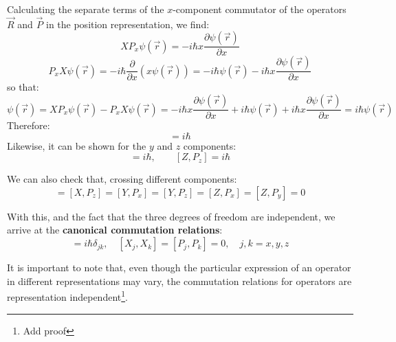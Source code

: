 Calculating the separate terms of the $x$-component commutator of the operators $\vec{R}$ and $\vec{P}$ in the position representation, we find:
\begin{equation}
    XP_x\psi(\vec{r}) = -i\hbar x \frac{\partial \psi(\vec{r})}{\partial x}
\end{equation}
\begin{equation}
    P_xX\psi(\vec{r}) = -i\hbar \frac{\partial}{\partial x}(x\psi(\vec{r})) = -i\hbar \psi(\vec{r}) - i \hbar x \frac{\partial \psi(\vec{r})}{\partial x}
\end{equation}
so that:
\begin{equation}
    [X,P_x]\psi(\vec{r}) = XP_x\psi(\vec{r}) - P_xX\psi(\vec{r}) = -i\hbar x \frac{\partial \psi(\vec{r})}{\partial x} + i\hbar \psi(\vec{r}) + i\hbar x \frac{\partial \psi(\vec{r})}{\partial x} = i\hbar \psi(\vec{r})
\end{equation}
Therefore:
\begin{equation}
    [X,P_x] = i\hbar
\end{equation}
Likewise, it can be shown for the $y$ and $z$ components:
\begin{equation}
    [Y,P_y] = i\hbar, \qquad [Z,P_z] = i\hbar
\end{equation}

We can also check that, crossing different components:
\begin{equation}
    [X, P_y] = [X, P_z] = [Y, P_x] = [Y, P_z] = [Z, P_x] = [Z, P_y] = 0
\end{equation}

With this, and the fact that the three degrees of freedom are independent, we arrive at the \textbf{canonical commutation relations}:
\begin{equation}
    [X_j, P_k] = i\hbar \delta_{jk}, \quad [X_j, X_k] = [P_j, P_k] = 0, \quad j,k = x,y,z
\end{equation}

It is important to note that, even though the particular expression of an operator in different representations may vary, the commutation relations for operators are representation independent\footnote{\color{red} Add proof}.



